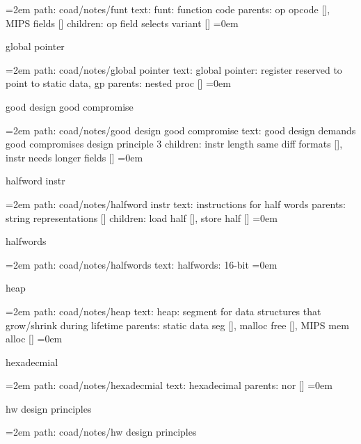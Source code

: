 \leftskip=2em
path: coad/notes/funt
\smallskip
text:  funt: function code
\smallskip
parents:  op opcode [], MIPS fields []
\smallskip
children: op field selects variant []
\smallskip
\leftskip=0em
\par\endgroup
\bigskip
{}
global pointer
\smallskip
\par\begingroup
\leftskip=2em
path: coad/notes/global pointer
\smallskip
text:  global pointer: register reserved to point to static data, gp
\smallskip
parents:  nested proc []
\smallskip
\leftskip=0em
\par\endgroup
\bigskip
{}
good design good compromise
\smallskip
\par\begingroup
\leftskip=2em
path: coad/notes/good design good compromise
\smallskip
text:  good design demands good compromises design principle 3
\smallskip
children: instr length same diff formats [], instr needs longer fields []
\smallskip
\leftskip=0em
\par\endgroup
\bigskip
{}
halfword instr
\smallskip
\par\begingroup
\leftskip=2em
path: coad/notes/halfword instr
\smallskip
text:  instructions for half words
\smallskip
parents:  string representations []
\smallskip
children: load half [], store half []
\smallskip
\leftskip=0em
\par\endgroup
\bigskip
{}
halfwords
\smallskip
\par\begingroup
\leftskip=2em
path: coad/notes/halfwords
\smallskip
text:  halfwords: 16-bit
\smallskip
\leftskip=0em
\par\endgroup
\bigskip
{}
heap
\smallskip
\par\begingroup
\leftskip=2em
path: coad/notes/heap
\smallskip
text:  heap: segment for data structures that grow/shrink during lifetime
\smallskip
parents:  static data seg [], malloc free [], MIPS mem alloc []
\smallskip
\leftskip=0em
\par\endgroup
\bigskip
{}
hexadecmial
\smallskip
\par\begingroup
\leftskip=2em
path: coad/notes/hexadecmial
\smallskip
text:  hexadecimal
\smallskip
parents:  nor []
\smallskip
\leftskip=0em
\par\endgroup
\bigskip
{}
hw design principles
\smallskip
\par\begingroup
\leftskip=2em
path: coad/notes/hw design principles
\smallskip
